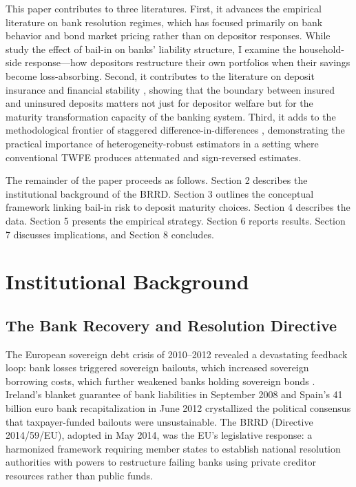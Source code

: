 \documentclass[12pt]{article}
\begin{document}
This paper contributes to three literatures. First, it advances the empirical literature on bank resolution regimes, which has focused primarily on bank behavior \citep{ignatowski2015regulatory, fischer2019eu} and bond market pricing \citep{schafer2016bail, conlon2020effect, berndt2020bail} rather than on depositor responses. While \citet{crespi2020bail} study the effect of bail-in on banks' liability structure, I examine the household-side response---how depositors restructure their own portfolios when their savings become loss-absorbing. Second, it contributes to the literature on deposit insurance and financial stability \citep{demirguc2004deposit, egan2017deposit, bonfim2020deposits}, showing that the boundary between insured and uninsured deposits matters not just for depositor welfare but for the maturity transformation capacity of the banking system. Third, it adds to the methodological frontier of staggered difference-in-differences \citep{callaway2021difference, sunab2021estimating, goodman2021difference}, demonstrating the practical importance of heterogeneity-robust estimators in a setting where conventional TWFE produces attenuated and sign-reversed estimates.

The remainder of the paper proceeds as follows. Section 2 describes the institutional background of the BRRD. Section 3 outlines the conceptual framework linking bail-in risk to deposit maturity choices. Section 4 describes the data. Section 5 presents the empirical strategy. Section 6 reports results. Section 7 discusses implications, and Section 8 concludes.


\section{Institutional Background}

\subsection{The Bank Recovery and Resolution Directive}

The European sovereign debt crisis of 2010--2012 revealed a devastating feedback loop: bank losses triggered sovereign bailouts, which increased sovereign borrowing costs, which further weakened banks holding sovereign bonds \citep{acharya2014bail}. Ireland's blanket guarantee of bank liabilities in September 2008 and Spain's 41 billion euro bank recapitalization in June 2012 crystallized the political consensus that taxpayer-funded bailouts were unsustainable. The BRRD (Directive 2014/59/EU), adopted in May 2014, was the EU's legislative response: a harmonized framework requiring member states to establish national resolution authorities with powers to restructure failing banks using private creditor resources rather than public funds.
\end{document}
